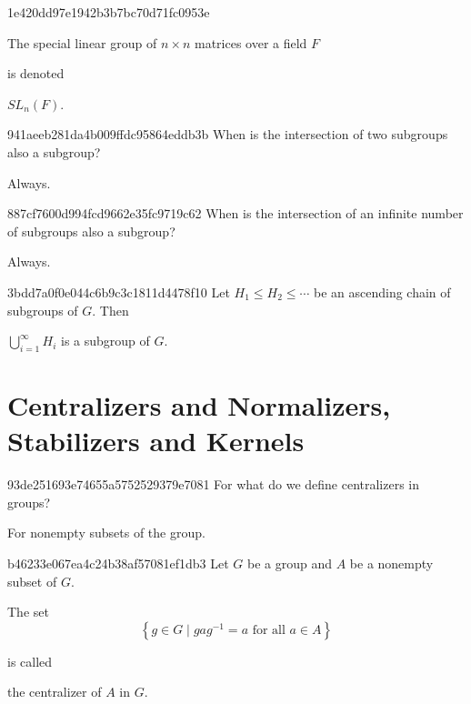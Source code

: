 \begin{note}{1e420dd97e1942b3b7bc70d71fc0953e}
    \begin{icloze}{2}The special linear group of \({ n \times n }\) matrices over a field \({ F }\)\end{icloze} is denoted \begin{icloze}{1}\({ SL_n(F) }\).\end{icloze}
\end{note}

\begin{note}{941aeeb281da4b009ffdc95864eddb3b}
    When is the intersection of two subgroups also a subgroup?

    \begin{cloze}{1}
        Always.
    \end{cloze}
\end{note}

\begin{note}{887cf7600d994fcd9662e35fc9719c62}
    When is the intersection of an infinite number of subgroups also a subgroup?

    \begin{cloze}{1}
        Always.
    \end{cloze}
\end{note}

\begin{note}{3bdd7a0f0e044c6b9c3c1811d4478f10}
    Let \({ H_1 \leq H_2 \leq \cdots }\) be an ascending chain of subgroups of \({ G }\).
    Then \begin{icloze}{1}\({ \bigcup_{i=1}^{\infty} H_i }\) is a subgroup of \({ G }\).\end{icloze}
\end{note}

\section{Centralizers and Normalizers, Stabilizers and Kernels}
\begin{note}{93de251693e74655a5752529379e7081}
    For what do we define centralizers in groups?

    \begin{cloze}{1}
        For nonempty subsets of the group.
    \end{cloze}
\end{note}

\begin{note}{b46233e067ea4c24b38af57081ef1db3}
    Let \({ G }\) be a group and \({ A }\) be a nonempty subset of \({ G }\).
    \begin{icloze}{1}
        The set
        \[
            \left\{ g \in G \mid gag^{-1} = a \text{ for all } a \in A \right\}
        \]
    \end{icloze}
    is called \begin{icloze}{2}the centralizer of \({ A }\) in \({ G }\).\end{icloze}
\end{note}

